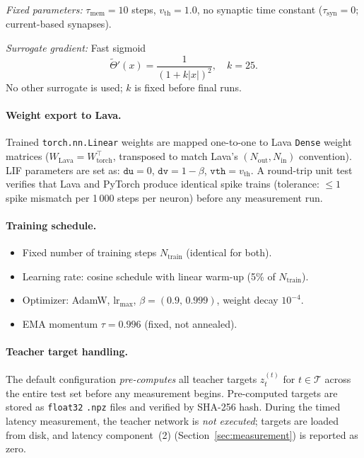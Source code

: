 \documentclass[11pt,a4paper]{article}
\begin{document}
\emph{Fixed parameters:} $\tau_{\text{mem}} = 10$ steps,
$v_{\text{th}} = 1.0$, no synaptic time constant
($\tau_{\text{syn}} = 0$; current-based synapses).

\emph{Surrogate gradient:} Fast
sigmoid~\cite{neftci2019surrogate,zenke2021remarkable}
\[
  \tilde{\Theta}'(x) = \frac{1}{(1 + k|x|)^2}, \quad k = 25.
\]
No other surrogate is used; $k$ is fixed before final runs.

\paragraph{Weight export to Lava.}
Trained \texttt{torch.nn.Linear} weights are mapped one-to-one to
Lava \texttt{Dense} weight matrices ($W_{\text{Lava}} = W_{\text{torch}}^{\!\top}$,
transposed to match Lava's $(N_{\text{out}},N_{\text{in}})$
convention).  LIF parameters are set as:
$\texttt{du} = 0$, $\texttt{dv} = 1 - \beta$,
$\texttt{vth} = v_{\text{th}}$.  A round-trip unit test verifies that
Lava and PyTorch produce identical spike trains (tolerance:
$\leq 1$ spike mismatch per 1\,000 steps per neuron) before any
measurement run.

\paragraph{Training schedule.}
\begin{itemize}[nosep]
\item Fixed number of training steps $N_{\text{train}}$ (identical for
  both).
\item Learning rate: cosine schedule with linear warm-up (5\% of
  $N_{\text{train}}$).
\item Optimizer: AdamW, $\text{lr}_{\max}$, $\beta=(0.9,\,0.999)$,
  weight decay $10^{-4}$.
\item EMA momentum $\tau=0.996$ (fixed, not annealed).
\end{itemize}

\paragraph{Teacher target handling.}\label{sec:teacher-handling}
The default configuration \emph{pre-computes} all teacher targets
$z_t^{(t)}$ for $t \in \mathcal{T}$ across the entire test set before
any measurement begins.  Pre-computed targets are stored as
\texttt{float32} \texttt{.npz} files and verified by SHA-256 hash.
During the timed latency measurement, the teacher network is
\emph{not executed}; targets are loaded from disk, and latency
component~(2) (Section~\ref{sec:measurement}) is reported as zero.
\end{document}
